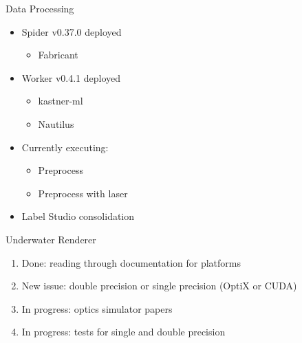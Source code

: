 \begin{frame}{Data Processing}
    \begin{itemize}
        \item Spider v0.37.0 deployed
        \begin{itemize}
            \item Fabricant
        \end{itemize}
        \item Worker v0.4.1 deployed
        \begin{itemize}
            \item kastner-ml
            \item Nautilus
        \end{itemize}
        \item Currently executing:
        \begin{itemize}
            \item Preprocess
            \item Preprocess with laser
        \end{itemize}
        \item Label Studio consolidation
    \end{itemize}
\end{frame}

\begin{frame}{Underwater Renderer}
    \begin{enumerate}
	\item Done: reading through documentation for platforms
	\item New issue: double precision or single precision (OptiX or CUDA)
	\item In progress: optics simulator papers
	\item In progress: tests for single and double precision
    \end{enumerate}
\end{frame}


